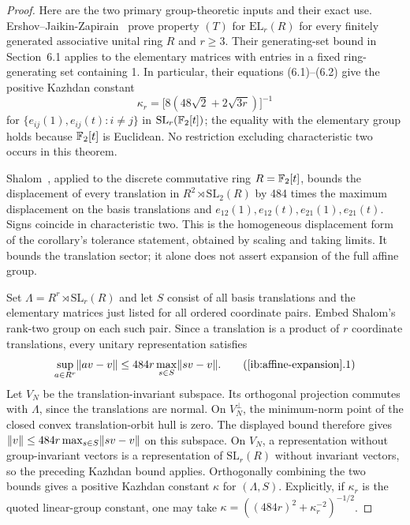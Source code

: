 \begin{proof}
Here are the two primary group-theoretic inputs and their exact use.
Ershov--Jaikin-Zapirain~\cite[Theorem~1.1]{EJZ2010} prove property
\((T)\) for \(\mathrm{EL}_r(R)\) for every finitely generated
associative unital ring \(R\) and \(r\ge3\).  Their generating-set
bound in Section~6.1 applies to the elementary matrices with entries
in a fixed ring-generating set containing 1.  In particular, their
equations (6.1)--(6.2) give the positive Kazhdan constant
\[
 \kappa_r=\bigl[8(48\sqrt2+2\sqrt{3r})\bigr]^{-1}
\]
for
\(\{e_{ij}(1),e_{ij}(t):i\ne j\}\) in
\(\mathrm{SL}_r(\mathbb{F}_2[t])\); the equality with the elementary group
holds because \(\mathbb{F}_2[t]\) is Euclidean.  No restriction excluding
characteristic two occurs in this theorem.

Shalom~\cite[Theorem~3.4 and Corollary~3.5]{Shalom1999}, applied to the discrete
commutative ring \(R=\mathbb{F}_2[t]\), bounds the displacement of every
translation in \(R^2\rtimes\mathrm{SL}_2(R)\) by 484 times the
maximum displacement on the basis translations and
\(e_{12}(1),e_{12}(t),e_{21}(1),e_{21}(t)\).  Signs coincide in
characteristic two.  This is the homogeneous displacement form of
the corollary's tolerance statement, obtained by scaling and taking
limits.  It bounds the translation sector; it alone does not assert
expansion of the full affine group.

Set \(\Lambda=R^r\rtimes\mathrm{SL}_r(R)\) and let \(S\) consist
of all basis translations and the elementary matrices just listed
for all ordered coordinate pairs.  Embed Shalom's rank-two group on
each such pair.  Since a translation is a product of \(r\)
coordinate translations, every unitary representation satisfies
\[
 \sup_{a\in R^r}\norm{av-v}
       \le 484r\max_{s\in S}\norm{sv-v}.
 \tag{\ref{ib:affine-expansion}.1}
\]
Let \(V_N\) be the translation-invariant subspace.  Its orthogonal
projection commutes with \(\Lambda\), since the translations are
normal.  On \(V_N^\perp\), the minimum-norm point of the closed
convex translation-orbit hull is zero.  The displayed bound therefore
gives
\(\lVert v\rVert\le484r\max_{s\in S}\lVert sv-v\rVert\) on this subspace.
On \(V_N\), a representation without group-invariant vectors is a
representation of \(\mathrm{SL}_r(R)\) without invariant vectors,
so the preceding Kazhdan bound applies.  Orthogonally combining the
two bounds gives a positive Kazhdan constant \(\kappa\) for
\((\Lambda,S)\).  Explicitly, if \(\kappa_r\) is the quoted
 linear-group constant, one may take
\(\kappa=((484r)^2+\kappa_r^{-2})^{-1/2}\).


\end{proof}

